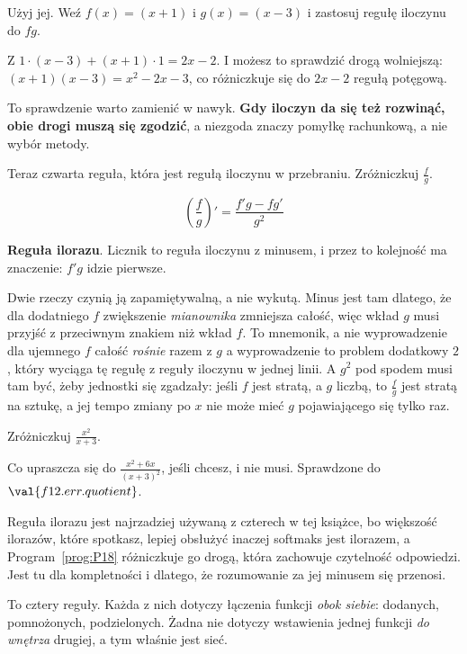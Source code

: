 \begin{fr}
Użyj jej. Weź $f(x) = (x+1)$ i $g(x) = (x-3)$ i zastosuj regułę iloczynu do
$fg$.
\nextframe
\end{fr}

\begin{fr}
Z $1 \cdot (x-3) + (x+1) \cdot 1 = 2x - 2$. I możesz to sprawdzić drogą
wolniejszą: $(x+1)(x-3) = x^{2} - 2x - 3$, co różniczkuje się do $2x - 2$
regułą potęgową.

To sprawdzenie warto zamienić w nawyk. \textbf{Gdy iloczyn da się też
rozwinąć, obie drogi muszą się zgodzić}, a niezgoda znaczy pomyłkę
rachunkową, a nie wybór metody.

Teraz czwarta reguła, która jest regułą iloczynu w przebraniu. Zróżniczkuj
$\frac{f}{g}$.
\dotline
\nextframe
\end{fr}

\begin{fr}
\begin{ansblock}
\[ \left(\frac{f}{g}\right)' = \frac{f'g - fg'}{g^{2}} \]
\end{ansblock}

\textbf{Reguła ilorazu}. Licznik to reguła iloczynu z minusem, i przez to
kolejność ma znaczenie: $f'g$ idzie pierwsze.

Dwie rzeczy czynią ją zapamiętywalną, a nie wykutą. Minus jest tam dlatego,
że dla dodatniego $f$ zwiększenie \emph{mianownika} zmniejsza całość, więc
wkład $g$ musi przyjść z przeciwnym znakiem niż wkład $f$. To mnemonik, a nie
wyprowadzenie \dash{} dla ujemnego $f$ całość \emph{rośnie} razem z $g$
\dash{} a wyprowadzenie to problem dodatkowy $2$, który wyciąga tę regułę z
reguły iloczynu w jednej linii. A $g^{2}$ pod spodem musi tam być, żeby
jednostki się zgadzały: jeśli $f$ jest stratą, a $g$ liczbą, to $\frac{f}{g}$
jest stratą na sztukę, a jej tempo zmiany po $x$ nie może mieć $g$
pojawiającego się tylko raz.

Zróżniczkuj $\frac{x^{2}}{x+3}$.
\nextframe
\end{fr}

\begin{fr}
Co upraszcza się do $\frac{x^{2} + 6x}{(x+3)^{2}}$, jeśli chcesz, i nie musi.
Sprawdzone do $\val{f12.err.quotient}$.

\begin{note}
Reguła ilorazu jest najrzadziej używaną z czterech w tej książce, bo większość
ilorazów, które spotkasz, lepiej obsłużyć inaczej \dash{} softmaks jest
ilorazem, a Program~\ref{prog:P18} różniczkuje go drogą, która zachowuje
czytelność odpowiedzi. Jest tu dla kompletności i dlatego, że rozumowanie za
jej minusem się przenosi.
\end{note}

To cztery reguły. Każda z nich dotyczy łączenia funkcji \emph{obok siebie}:
dodanych, pomnożonych, podzielonych. Żadna nie dotyczy wstawienia jednej
funkcji \emph{do wnętrza} drugiej, a tym właśnie jest sieć.
\end{fr}


